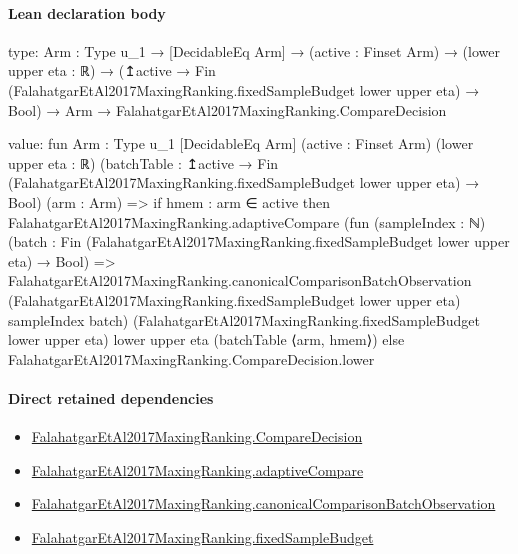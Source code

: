 \documentclass[10pt]{article}
\begin{document}
\paragraph{Lean declaration body}
\begin{ReviewVerbatim}
type:
{Arm : Type u_1} →
  [DecidableEq Arm] →
    (active : Finset Arm) →
      (lower upper eta : ℝ) →
        (↥active → Fin (FalahatgarEtAl2017MaxingRanking.fixedSampleBudget lower upper eta) → Bool) →
          Arm → FalahatgarEtAl2017MaxingRanking.CompareDecision

value:
fun {Arm : Type u_1} [DecidableEq Arm] (active : Finset Arm) (lower upper eta : ℝ)
    (batchTable : ↥active → Fin (FalahatgarEtAl2017MaxingRanking.fixedSampleBudget lower upper eta) → Bool)
    (arm : Arm) =>
  if hmem : arm ∈ active then
    FalahatgarEtAl2017MaxingRanking.adaptiveCompare
      (fun (sampleIndex : ℕ) (batch : Fin (FalahatgarEtAl2017MaxingRanking.fixedSampleBudget lower upper eta) → Bool) =>
        FalahatgarEtAl2017MaxingRanking.canonicalComparisonBatchObservation
          (FalahatgarEtAl2017MaxingRanking.fixedSampleBudget lower upper eta) sampleIndex batch)
      (FalahatgarEtAl2017MaxingRanking.fixedSampleBudget lower upper eta) lower upper eta (batchTable ⟨arm, hmem⟩)
  else FalahatgarEtAl2017MaxingRanking.CompareDecision.lower
\end{ReviewVerbatim}

\paragraph{Direct retained dependencies}
\begin{itemize}\raggedright
\item \hyperlink{governing-declaration-3723216c72fc3dc8}{Falahatgar\allowbreak{}Et\allowbreak{}Al2017\allowbreak{}Maxing\allowbreak{}Ranking.\allowbreak{}Compare\allowbreak{}Decision}
\item \hyperlink{paper-prerequisite-8b894f32c9664991}{Falahatgar\allowbreak{}Et\allowbreak{}Al2017\allowbreak{}Maxing\allowbreak{}Ranking.\allowbreak{}adaptive\allowbreak{}Compare}
\item \hyperlink{governing-declaration-1ffc62264cfecf06}{Falahatgar\allowbreak{}Et\allowbreak{}Al2017\allowbreak{}Maxing\allowbreak{}Ranking.\allowbreak{}canonical\allowbreak{}Comparison\allowbreak{}Batch\allowbreak{}Observation}
\item \hyperlink{governing-declaration-4b4daf4bb2493573}{Falahatgar\allowbreak{}Et\allowbreak{}Al2017\allowbreak{}Maxing\allowbreak{}Ranking.\allowbreak{}fixed\allowbreak{}Sample\allowbreak{}Budget}
\end{itemize}
\hypertarget{governing-declaration-7ad8cf05c188caa1}{}
\end{document}
